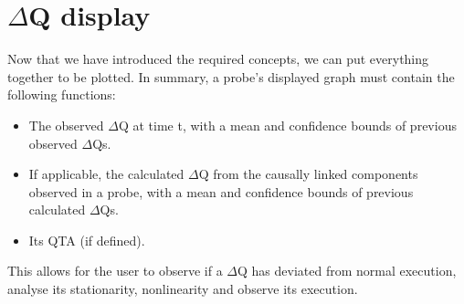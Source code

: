 \section{$\Delta$Q display}
    Now that we have introduced the required concepts, we can put everything together to be plotted. In summary, a probe's displayed graph must contain the following functions:
    \begin{itemize}
        \item The observed $\Delta$Q at time t, with a mean and confidence bounds of previous observed $\Delta$Qs.
        \item If applicable, the calculated $\Delta$Q from the causally linked components observed in a probe, with a mean and confidence bounds of previous calculated $\Delta$Qs.
        \item Its QTA (if defined).
    \end{itemize}
    This allows for the user to observe if a $\Delta$Q has deviated from normal execution, analyse its stationarity, nonlinearity and observe its execution.

